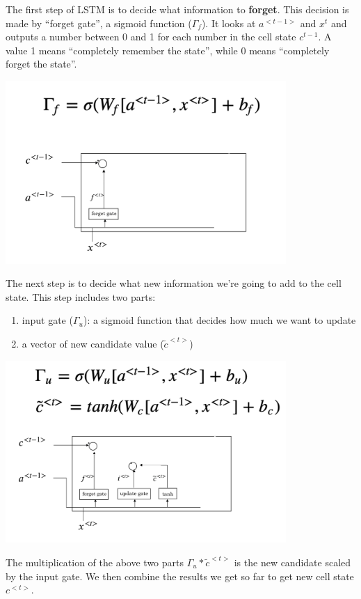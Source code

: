 \documentclass[
  12pt,
]{krantz}
\providecommand{\tightlist}{%
  \setlength{\itemsep}{0pt}\setlength{\parskip}{0pt}}
\begin{document}
The first step of LSTM is to decide what information to \textbf{forget}. This decision is made by ``forget gate'', a sigmoid function (\(\Gamma_{f}\)). It looks at \(a^{<t-1>}\) and \(x^{t}\) and outputs a number between 0 and 1 for each number in the cell state \(c^{t-1}\). A value 1 means ``completely remember the state'', while 0 means ``completely forget the state''.

\includegraphics[width=0.8\textwidth,height=\textheight]{images/lstm1.png}

The next step is to decide what new information we're going to add to the cell state. This step includes two parts:

\begin{enumerate}
\def\labelenumi{\arabic{enumi}.}
\tightlist
\item
  input gate (\(\Gamma_{u}\)): a sigmoid function that decides how much we want to update
\item
  a vector of new candidate value (\(\tilde{c}^{<t>}\))
\end{enumerate}

\includegraphics[width=0.8\textwidth,height=\textheight]{images/lstm2.png}

The multiplication of the above two parts \(\Gamma_{u}*\tilde{c}^{<t>}\) is the new candidate scaled by the input gate. We then combine the results we get so far to get new cell state \(c^{<t>}\).
\end{document}

